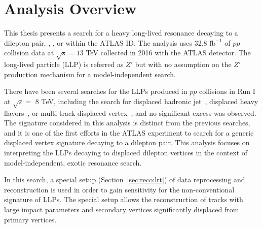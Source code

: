 \chapter{Analysis Overview}
\label{chap:analysis_overview}

This thesis presents a search for a heavy long-lived resonance decaying to a dilepton pair, \mumu, \ee, or \emu within the ATLAS ID. The analysis uses 32.8 $\mathrm{fb^{-1}}$ of $pp$ collision data at $\sqrt{s}=13$ TeV collected in 2016 with the ATLAS detector. The long-lived particle (LLP) is referred as $Z'$ but with no assumption on the $Z'$ production mechanism for a model-independent search.

There have been several searches for the LLPs produced in $pp$ collisions in Run I at $\sqrt{s} =$ 8 TeV, including the search for displaced hadronic jet~\cite{Blackburn:1550730}, displaced heavy flavors~\cite{Harris:1512932}, or multi-track displaced vertex~\cite{Aad:2015rba}, and no significant excess was observed. The signature considered in this analysis is distinct from the previous searches, and it is one of the first efforts in the ATLAS experiment to search for a generic displaced vertex signature decaying to a dilepton pair. This analysis focuses on interpreting the LLPs decaying to displaced dilepton vertices in the context of model-independent, exotic resonance search.

In this search, a special setup (Section~\ref{sec:reco:lrt}) of data reprocessing and reconstruction is used in order to gain sensitivity for the non-conventional signature of LLPs. The special setup allows the reconstruction of tracks with large impact parameters and secondary vertices significantly displaced from primary vertices. 
